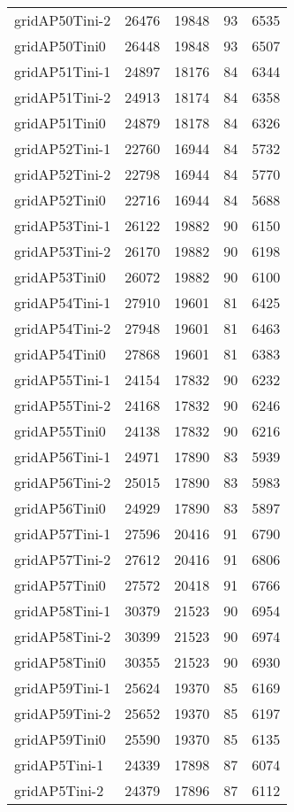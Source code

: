 \begin{longtable}{lrrrr}
gridAP50Tini-2 & 26476 & 19848 & 93 & 6535 \\
gridAP50Tini0 & 26448 & 19848 & 93 & 6507 \\
gridAP51Tini-1 & 24897 & 18176 & 84 & 6344 \\
gridAP51Tini-2 & 24913 & 18174 & 84 & 6358 \\
gridAP51Tini0 & 24879 & 18178 & 84 & 6326 \\
gridAP52Tini-1 & 22760 & 16944 & 84 & 5732 \\
gridAP52Tini-2 & 22798 & 16944 & 84 & 5770 \\
gridAP52Tini0 & 22716 & 16944 & 84 & 5688 \\
gridAP53Tini-1 & 26122 & 19882 & 90 & 6150 \\
gridAP53Tini-2 & 26170 & 19882 & 90 & 6198 \\
gridAP53Tini0 & 26072 & 19882 & 90 & 6100 \\
gridAP54Tini-1 & 27910 & 19601 & 81 & 6425 \\
gridAP54Tini-2 & 27948 & 19601 & 81 & 6463 \\
gridAP54Tini0 & 27868 & 19601 & 81 & 6383 \\
gridAP55Tini-1 & 24154 & 17832 & 90 & 6232 \\
gridAP55Tini-2 & 24168 & 17832 & 90 & 6246 \\
gridAP55Tini0 & 24138 & 17832 & 90 & 6216 \\
gridAP56Tini-1 & 24971 & 17890 & 83 & 5939 \\
gridAP56Tini-2 & 25015 & 17890 & 83 & 5983 \\
gridAP56Tini0 & 24929 & 17890 & 83 & 5897 \\
gridAP57Tini-1 & 27596 & 20416 & 91 & 6790 \\
gridAP57Tini-2 & 27612 & 20416 & 91 & 6806 \\
gridAP57Tini0 & 27572 & 20418 & 91 & 6766 \\
gridAP58Tini-1 & 30379 & 21523 & 90 & 6954 \\
gridAP58Tini-2 & 30399 & 21523 & 90 & 6974 \\
gridAP58Tini0 & 30355 & 21523 & 90 & 6930 \\
gridAP59Tini-1 & 25624 & 19370 & 85 & 6169 \\
gridAP59Tini-2 & 25652 & 19370 & 85 & 6197 \\
gridAP59Tini0 & 25590 & 19370 & 85 & 6135 \\
gridAP5Tini-1 & 24339 & 17898 & 87 & 6074 \\
gridAP5Tini-2 & 24379 & 17896 & 87 & 6112 \\

\end{longtable}
